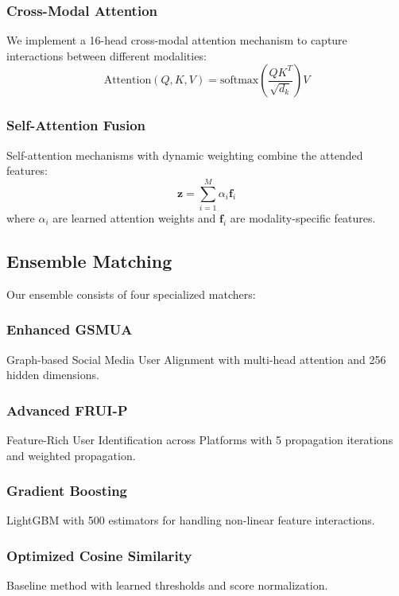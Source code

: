 \documentclass[conference]{IEEEtran}
\begin{document}
\subsubsection{Cross-Modal Attention}
We implement a 16-head cross-modal attention mechanism to capture interactions between different modalities:
\begin{equation}
\text{Attention}(Q, K, V) = \text{softmax}\left(\frac{QK^T}{\sqrt{d_k}}\right)V
\end{equation}

\subsubsection{Self-Attention Fusion}
Self-attention mechanisms with dynamic weighting combine the attended features:
\begin{equation}
\mathbf{z} = \sum_{i=1}^{M} \alpha_i \mathbf{f}_i
\end{equation}
where $\alpha_i$ are learned attention weights and $\mathbf{f}_i$ are modality-specific features.

\subsection{Ensemble Matching}

Our ensemble consists of four specialized matchers:

\subsubsection{Enhanced GSMUA}
Graph-based Social Media User Alignment with multi-head attention and 256 hidden dimensions.

\subsubsection{Advanced FRUI-P}
Feature-Rich User Identification across Platforms with 5 propagation iterations and weighted propagation.

\subsubsection{Gradient Boosting}
LightGBM with 500 estimators for handling non-linear feature interactions.

\subsubsection{Optimized Cosine Similarity}
Baseline method with learned thresholds and score normalization.
\end{document}
